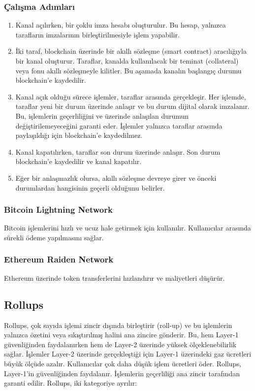 \subsubsection{Çalışma Adımları}

\begin{enumerate}
    \item Kanal açılırken, bir çoklu imza hesabı oluşturulur. Bu hesap, yalnızca tarafların imzalarının birleştirilmesiyle işlem yapabilir.
    \item İki taraf, blockchain üzerinde bir akıllı sözleşme (smart contract) aracılığıyla bir kanal oluşturur. Taraflar, kanalda kullanılacak bir teminat (collateral) veya fonu akıllı sözleşmeyle kilitler. Bu aşamada kanalın başlangıç durumu blockchain'e kaydedilir.
    \item Kanal açık olduğu sürece işlemler, taraflar arasında gerçekleşir. Her işlemde, taraflar yeni bir durum üzerinde anlaşır ve bu durum dijital olarak imzalanır. Bu, işlemlerin geçerliliğini ve üzerinde anlaşılan durumun değiştirilemeyeceğini garanti eder. İşlemler yalnızca taraflar arasında paylaşıldığı için blockchain'e kaydedilmez.
    \item Kanal kapatılırken, taraflar son durum üzerinde anlaşır. Son durum blockchain'e kaydedilir ve kanal kapatılır.
    \item Eğer bir anlaşmazlık olursa, akıllı sözleşme devreye girer ve önceki durumlardan hangisinin geçerli olduğunu belirler.
\end{enumerate}

\subsubsection{Bitcoin Lightning Network}

Bitcoin işlemlerini hızlı ve ucuz hale getirmek için kullanılır. Kullanıcılar arasında sürekli ödeme yapılmasını sağlar.

\subsubsection{Ethereum Raiden Network}

Ethereum üzerinde token transferlerini hızlandırır ve maliyetleri düşürür.

\subsection{Rollups}

Rollups, çok sayıda işlemi zincir dışında birleştirir (roll-up) ve bu işlemlerin yalnızca özetini veya sıkıştırılmış halini ana zincire gönderir. Bu, hem Layer-1 güvenliğinden faydalanırken hem de Layer-2 üzerinde yüksek ölçeklenebilirlik sağlar. İşlemler Layer-2 üzerinde gerçekleştiği için Layer-1 üzerindeki gaz ücretleri büyük ölçüde azalır. Kullanıcılar çok daha düşük işlem ücretleri öder. Rollups, Layer-1'in güvenliğinden faydalanır. İşlemlerin geçerliliği ana zincir tarafından garanti edilir. Rollups, iki kategoriye ayrılır:

